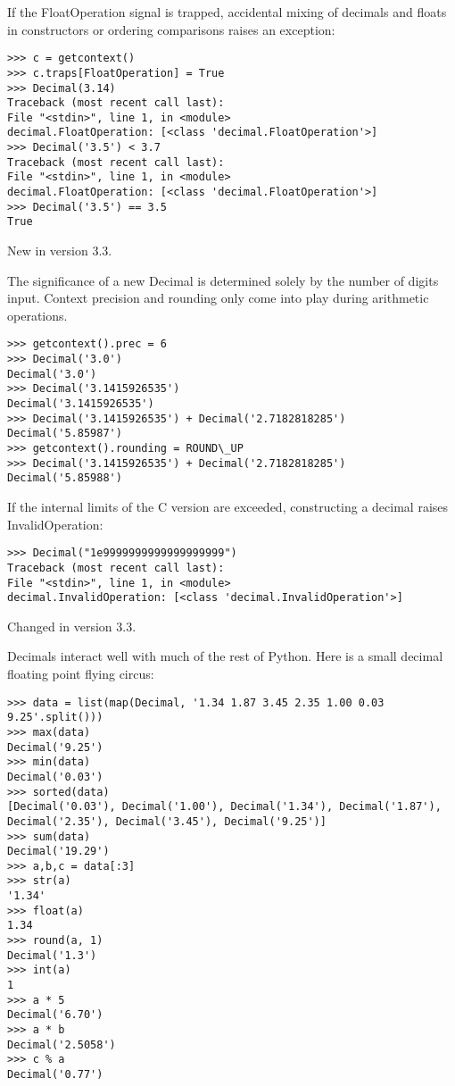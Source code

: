 If the FloatOperation signal is trapped, accidental mixing of decimals and floats in constructors or ordering comparisons raises an exception:

\begin{lstlisting}
>>> c = getcontext()
>>> c.traps[FloatOperation] = True
>>> Decimal(3.14)
Traceback (most recent call last):
File "<stdin>", line 1, in <module>
decimal.FloatOperation: [<class 'decimal.FloatOperation'>]
>>> Decimal('3.5') < 3.7
Traceback (most recent call last):
File "<stdin>", line 1, in <module>
decimal.FloatOperation: [<class 'decimal.FloatOperation'>]
>>> Decimal('3.5') == 3.5
True
\end{lstlisting}

New in version 3.3.

The significance of a new Decimal is determined solely by the number of digits input. Context precision and rounding only come into play during arithmetic operations.

\begin{lstlisting}
>>> getcontext().prec = 6
>>> Decimal('3.0')
Decimal('3.0')
>>> Decimal('3.1415926535')
Decimal('3.1415926535')
>>> Decimal('3.1415926535') + Decimal('2.7182818285')
Decimal('5.85987')
>>> getcontext().rounding = ROUND\_UP
>>> Decimal('3.1415926535') + Decimal('2.7182818285')
Decimal('5.85988')
\end{lstlisting}

If the internal limits of the C version are exceeded, constructing a decimal raises InvalidOperation:

\begin{lstlisting}
>>> Decimal("1e9999999999999999999")
Traceback (most recent call last):
File "<stdin>", line 1, in <module>
decimal.InvalidOperation: [<class 'decimal.InvalidOperation'>]
\end{lstlisting}


Changed in version 3.3.

Decimals interact well with much of the rest of Python. Here is a small decimal floating point flying circus:

\begin{lstlisting}
>>> data = list(map(Decimal, '1.34 1.87 3.45 2.35 1.00 0.03 9.25'.split()))
>>> max(data)
Decimal('9.25')
>>> min(data)
Decimal('0.03')
>>> sorted(data)
[Decimal('0.03'), Decimal('1.00'), Decimal('1.34'), Decimal('1.87'),
Decimal('2.35'), Decimal('3.45'), Decimal('9.25')]
>>> sum(data)
Decimal('19.29')
>>> a,b,c = data[:3]
>>> str(a)
'1.34'
>>> float(a)
1.34
>>> round(a, 1)
Decimal('1.3')
>>> int(a)
1
>>> a * 5
Decimal('6.70')
>>> a * b
Decimal('2.5058')
>>> c % a
Decimal('0.77')
\end{lstlisting}

